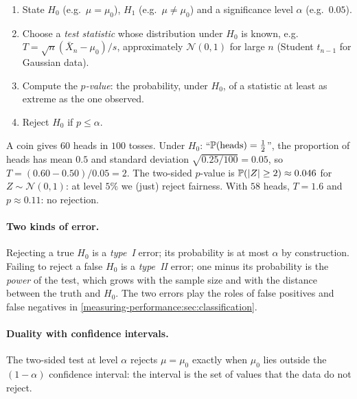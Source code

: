 \begin{notechapter}
\begin{enumerate}
  \item State $H_0$ (e.g.\ $\mu = \mu_0$), $H_1$ (e.g.\ $\mu\neq\mu_0$) and a
        significance level $\alpha$ (e.g.\ $0.05$).
  \item Choose a \emph{test statistic} whose distribution under $H_0$ is known,
        e.g.\ $T = \sqrt n(\bar X_n - \mu_0)/s$, approximately $\mathcal N(0,1)$
        for large $n$ (Student $t_{n-1}$ for Gaussian data).
  \item Compute the \emph{$p$-value}: the probability, under $H_0$, of a
        statistic at least as extreme as the one observed.
  \item Reject $H_0$ if $p\leq\alpha$.
\end{enumerate}

\begin{example}\label{lln-clt-inference:ex:coin}
A coin gives $60$ heads in $100$ tosses. Under $H_0$: ``$\mathbb{P}(\text{heads}) = \frac12$'',
the proportion of heads has mean $0.5$ and standard deviation
$\sqrt{0.25/100} = 0.05$, so $T = (0.60 - 0.50)/0.05 = 2$. The two-sided $p$-value
is $\mathbb{P}(\left|Z\right|\geq2)\approx0.046$ for $Z\sim\mathcal N(0,1)$: at level $5\%$ we
(just) reject fairness. With $58$ heads, $T = 1.6$ and $p\approx0.11$: no
rejection.
\end{example}

\paragraph{Two kinds of error.} Rejecting a true $H_0$ is a \emph{type~I} error;
its probability is at most $\alpha$ by construction. Failing to reject a false
$H_0$ is a \emph{type~II} error; one minus its probability is the \emph{power} of
the test, which grows with the sample size and with the distance between the
truth and $H_0$. The two errors play the roles of false positives and false
negatives in \cref{measuring-performance:sec:classification}.

\paragraph{Duality with confidence intervals.} The two-sided test at level
$\alpha$ rejects $\mu = \mu_0$ exactly when $\mu_0$ lies outside the
$(1-\alpha)$ confidence interval: the interval is the set of values that the
data do not reject.


\end{notechapter}

